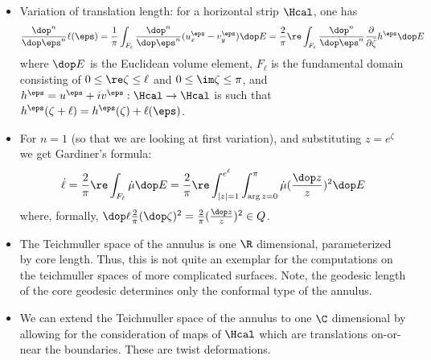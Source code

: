 \documentclass[11pt]{amsart}
\begin{document}
\begin{itemize}
  \item Variation of translation length: for a horizontal strip $\Hcal$, one has \[ \frac{\dop ^n }{\dop \eps^n}\ell(\eps) = \frac{1}{\pi} \int_{F_{\ell} }  \frac{\dop ^n}{\dop \eps^n} (u_x^\eps -v_y^\eps ) \dop E= \frac{2}{\pi}\re  \int_{F_{\ell} }  \frac{\dop ^n}{\dop \eps^n} \frac{\partial}{\partial \bar{\zeta}} h^\eps \dop E \] where $\dop E$ is the Euclidean volume element, $F_\ell$ is the fundamental domain consisting of $0\leq \re \zeta \leq \ell$ and $0\leq \im \zeta \leq \pi$,  and $h^\eps = u^\eps +i v^\eps : \Hcal \to \Hcal$ is such that $h^\eps(\zeta+\ell) = h^\eps (\zeta) + \ell (\eps)$. 
  \item  For $n=1$ (so that we are looking at first variation), and substituting $z=e^{\zeta}$ we get Gardiner's formula:    \[ \dot{\ell} = \frac{2}{\pi} \re \int_{F_\ell} \dot{\mu} \dop E = \frac{2}{\pi} \re \int_{|z| =1}^{e^\ell} \int_{\arg z= 0}^\pi  \dot{\mu}(\frac{\dop z}{z})^2 \dop E \] where, formally, $\dop \ell \frac{2}{\pi }(\dop \zeta)^2 = \frac{2}{\pi} (\frac{\dop z}{z})^2 \in Q$. 
  \item The Teichmuller space of the annulus is one $\R$ dimensional, parameterized by core length. Thus, this is not quite an exemplar for the computations on the teichmuller spaces of more complicated surfaces. Note, the geodesic length of the core geodesic determines only the conformal type of the annulus. 
  \item We can extend the Teichmuller space of the annulus to one $\C$ dimensional by allowing for the consideration of maps of $\Hcal$ which are translations on-or-near the boundaries.  These are twist deformations. 
\end{itemize}
\end{document}
